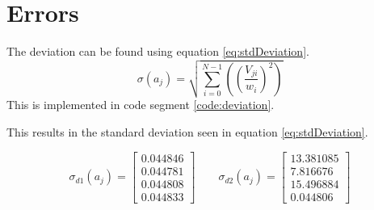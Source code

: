 \section{Errors}
The deviation can be found using equation \ref{eq:stdDeviation}.
\[
\sigma\left(a_j\right) = \sqrt{ \sum_{i=0}^{N-1} \left( \left( \frac{V_{ji}}{w_i}\right)^2\right) }
\label{eq:stdDeviation}
\]
This is implemented in code segment \ref{code:deviation}.


This results in the standard deviation seen in equation \ref{eq:stdDeviation}.

\begin{equation}
\sigma_{d1}\left(a_j\right) = 
    \left[
        \begin{array}{c}
        0.044846 \\
        0.044781 \\
        0.044808 \\
        0.044833
        \end{array}
    \right]
\qquad
\sigma_{d2}\left(a_j\right) = 
    \left[
        \begin{array}{c}
        13.381085\\ 
        7.816676\\ 
        15.496884\\ 
        0.044806
        \end{array}
    \right]
\label{eq:stdDeviation}
\end{equation}